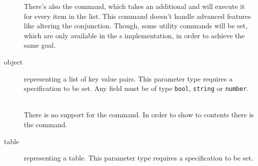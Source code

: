 \documentclass{ltxdoc}
\newcommand\showexample[5][15pt]{%
\begin{minipage}[t]{.5\linewidth - .5 \columnsep}%

\end{minipage}\hspace*{\columnsep}%
\begin{minipage}[t]{.5\linewidth - .5 \columnsep}%

\end{minipage}\\%
}
\begin{document}
\begin{description}
        \DescribeMacro{\forparamlist}
        There's also the \cmd{\forparamlist} command, which takes an additional  and will execute it for every item in the list.
        This command doesn't handle advanced features like altering the conjunction.
        Though, some utility commands will be set, which are only available in the s implementation, in order to achieve the same goal.
        \item[object] representing a list of key value pairs.
        This parameter type requires a  specification to be set.
        Any field must be of type \texttt{bool}, \texttt{string} or \texttt{number}.\\
        \showexample{16}{16-24}{7}{7-9}
        There is no support for the \cmd{\param} command.
        \DescribeMacro{\paramfield}
        In order to show to contents there is the \cmd{\paramfield} command.

        \item[table] representing a table.
        This parameter type requires a  specification to be set.\\
        \showexample[20pt]{25}{25}{10}{10}
    \end{description}

%    
%
%    
\end{document}
